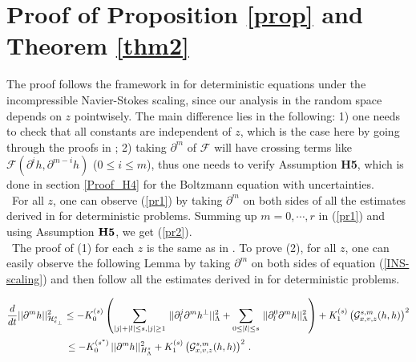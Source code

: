 \documentclass[final,onefignum,onetabnum]{siamart171218}
\begin{document}
\section{Proof of Proposition \ref{prop} and Theorem \ref{thm2}}
\label{Proof_Thms}
The proof follows the framework in \cite{MB} for deterministic equations under the incompressible Navier-Stokes scaling, since our analysis in the random space
depends on $z$ pointwisely. The main difference lies in the following:
1) one needs to check that all constants are independent of $z$, which is the case here by going through the proofs in
\cite{MB}; 2) taking $\partial^m$ of $\mathcal F$ will have crossing terms like $\mathcal F(\partial^i h, \partial^{m-i} h)$ ($0\leq i\leq m$), thus one needs to
verify Assumption {\bf H5}, which is done in section \ref{Proof_H4} for the Boltzmann equation with uncertainties.
\\[2pt]

\,
For all $z$, one can observe (\ref{pr1}) by taking $\partial^m$ on both sides of all the estimates derived in \cite{MB}
for deterministic problems.
Summing up $m=0, \cdots, r$ in (\ref{pr1}) and using Assumption ${\bf H5}$, we get (\ref{pr2}).
\\[2pt]

\,
The proof of (1) for each $z$ is the same as in \cite{MB}.
To prove (2), for all $z$, one can easily observe the following Lemma by taking $\partial^m$ on both sides of equation (\ref{INS-scaling}) and then follow
all the estimates derived in \cite{MB}
for deterministic problems.
\begin{lemma}
\begin{align}
&\displaystyle \frac{d}{dt}||\partial^{m} h||_{\mathcal H_{\epsilon_{\perp}}^s}^2 \leq
- K_0^{(s)}\left(\sum_{|j|+|l|\leq s, |j|\geq 1}\, ||\partial_l^j \partial^m h^{\perp}||_{\Lambda}^2 +
\sum_{0\leq |l|\leq s}\, ||\partial_l^0 \partial^m h||_{\Lambda}^2\right) + K_1^{(s)}\left(\mathcal G_{x,v,z}^{s,m}(h,h)\right)^2 \notag\\[2pt]
&\displaystyle \label{pr3}\qquad\qquad\qquad\leq - K_0^{(s^{\ast})}\, ||\partial^m h||_{H_{\Lambda}^s}^2 + K_1^{(s)}\left(\mathcal G_{x,v,z}^{s,m}(h,h)\right)^2\,.
\end{align}
\end{lemma}
\end{document}
